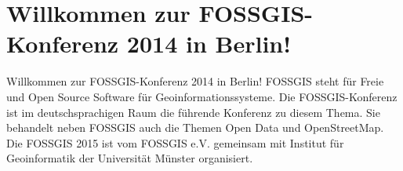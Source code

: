 \newpage
\section*{Willkommen zur FOSSGIS-Konferenz 2014 in Berlin!} \label{welcome}
Willkommen zur FOSSGIS-Konferenz 2014 in Berlin!
FOSSGIS steht für Freie und Open Source Software für Geoinformationssysteme. 
Die FOSSGIS-Konferenz ist im deutschsprachigen
Raum die führende Konferenz zu diesem Thema. Sie behandelt neben
FOSSGIS auch die Themen Open Data und OpenStreetMap.
Die FOSSGIS 2015 ist vom FOSSGIS e.V. gemeinsam mit Institut für Geoinformatik der 
Universität Münster organisiert.